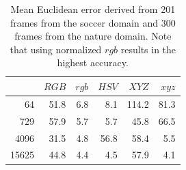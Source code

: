 \documentclass[11pt]{article}
\begin{document}
\begin{table}
\centering
\begin{tabular}{r||r|r|r|r|r}
	      & $RGB$ & $rgb$ & $HSV$ & $XYZ$ & $xyz$ \\ \hline \hline
	   64 &  51.8 &   6.8 &   8.1 & 114.2 &  81.3 \\ \hline
	  729 &  57.9 &   5.7 &   5.7 &  45.8 &  66.5 \\ \hline
	 4096 &  31.5 &   4.8 &  56.8 &  58.4 &   5.5 \\ \hline
	15625	&  44.8 &   4.4 &   4.5 &  57.9 &   4.1 \\ \hline
\end{tabular}
\caption{Mean Euclidean error derived from 201 frames from the soccer domain and
300 frames from the nature domain. Note that using normalized $rgb$ results in
the highest accuracy.}
\label{table:error}
\end{table}
\end{document}
